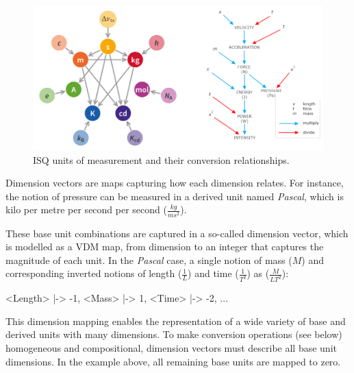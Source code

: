 \documentclass[runningheads,a4paper]{llncs}
\begin{document}
\begin{figure}[htbp]
    \centering
        \includegraphics[width=\textwidth,scale=0.4]{figures/ISQLibUnitRelationships2.png}
    \caption{ISQ units of measurement and their conversion relationships.}\label{fig:UnitRelationships}
 \end{figure}

Dimension vectors are maps capturing how each dimension relates. For instance, the notion of pressure can be measured in a derived unit named \textit{Pascal}, which is kilo per metre per second per second (\(\frac{kg}{ms^2}\)). 

These base unit combinations are captured in a so-called dimension vector, which is modelled as a VDM map, from dimension to an integer that captures the magnitude of each unit. In the \textit{Pascal} case, a single notion of mass (\(M\)) and corresponding inverted notions of length (\(\frac{1}{L}\)) and time (\(\frac{1}{T^2}\)) as (\(\frac{M}{LT^2}\)): 
%
\begin{vdmsl}[frame=none,basicstyle=\ttfamily\scriptsize]
    { <Length> |-> -1, <Mass> |-> 1, <Time> |-> -2, ... }
\end{vdmsl}   
%
\noindent This dimension mapping enables the representation of a wide variety of base and derived units with many dimensions. To make conversion operations (see below) homogeneous and compositional, dimension vectors must describe all base unit dimensions. In the example above, all remaining base units are mapped to zero.
\end{document}
